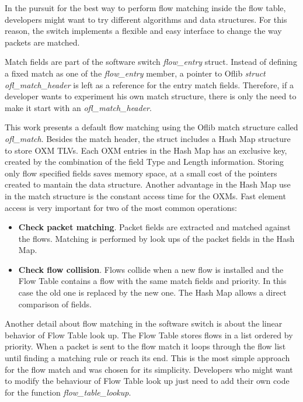    In the pursuit for the best way to perform flow matching inside the flow table, developers might want to try different algorithms and data structures. For this reason, the switch implements a flexible and easy interface to change the way packets are matched. 
    
    Match fields are part of the software switch \textit{flow_entry} struct. Instead of defining a fixed match as one of the \textit{flow_entry} member, a pointer to Oflib \textit{struct ofl_match_header} is left as a reference for the entry match fields. Therefore, if a developer wants to experiment his own match structure, there is only the need to make it start with an \textit{ ofl_match_header}.    

    This work presents a default flow matching using the Oflib match structure called \textit{ofl_match}. Besides the match header, the struct includes a Hash Map structure to store OXM TLVs. Each OXM entries in the Hash Map has an  exclusive key, created by the combination of the field Type and Length information. Storing only flow specified fields saves memory space, at a small cost of the pointers created to mantain the data structure. Another advantage in the Hash Map use in the match structure is the constant access time for the OXMs. Fast element access is very important for two of the most common operations:
    
    \begin{itemize}
    \item \textbf{Check packet matching}. Packet fields are extracted and matched against the flows. Matching is performed by look ups of the packet fields in the Hash Map.        
    
    \item \textbf{Check flow collision}. Flows collide when a new flow is installed and the Flow Table contains a flow with the same match fields and priority. In this case the old one is replaced by the new one. The Hash Map allows a direct comparison of fields.
    \end{itemize}

    Another detail about flow matching in the software switch is about the linear behavior of Flow Table look up. The Flow Table stores flows in a list ordered by priority. When a packet is sent to the flow match it loops through the flow list until finding a matching rule or reach its end. This is the most simple approach for the flow match and was chosen for its simplicity. Developers who might want to modify the behaviour of Flow Table look up just need to add their own code for the function \textit{flow_table_lookup}.
         

